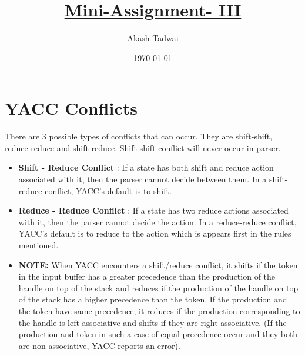 \documentclass[english,a4paper,12pt]{article}
\title{\textbf{\underline{\Huge{Mini-Assignment- III }}}}
\author{Akash Tadwai}
\date{\today}
\begin{document}
\maketitle

\section{YACC Conflicts}
    There are 3 possible types of conflicts that can occur. They are shift-shift, reduce-reduce and
shift-reduce. Shift-shift conflict will never occur in parser. \\ 
\begin{itemize}
    \item \textbf{Shift - Reduce Conflict} :
If a state has both shift and reduce action associated with it, then the parser cannot decide
between them. In a shift-reduce conflict, YACC’s default is to shift.
\item \textbf{Reduce - Reduce Conflict} :
If a state has two reduce actions associated with it, then the parser cannot decide the action.
In a reduce-reduce conflict, YACC’s default is to reduce to the action which is appears first
in the rules mentioned. \\ 
\item \textbf{NOTE:} When YACC encounters a shift/reduce conflict, it shifts if the token in the input buffer has a greater precedence than the production of the handle on top of the stack and reduces if the production of the handle on top of the stack has a higher precedence than the token. If the production and the token have same precedence, it reduces if the production corresponding to the handle is left associative and shifts if they are right associative. (If the production and token in such a case of equal precedence occur and they both are non associative, YACC reports an error).
\end{itemize}
\end{document}
